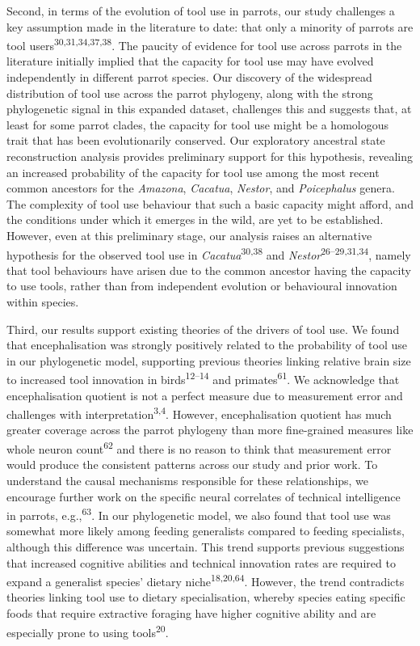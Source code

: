 \documentclass[
  man, donotrepeattitle,floatsintext]{apa6}
\begin{document}
Second, in terms of the evolution of tool use in parrots, our study challenges a
key assumption made in the literature to date: that only a minority of parrots
are tool users\textsuperscript{30,31,34,37,38}.
The paucity of evidence for tool use across parrots in the literature initially
implied that the capacity for tool use may have evolved independently in
different parrot species. Our discovery of the widespread distribution of tool
use across the parrot phylogeny, along with the strong phylogenetic signal in
this expanded dataset, challenges this and suggests that, at least for some
parrot clades, the capacity for tool use might be a homologous trait that has
been evolutionarily conserved. Our exploratory ancestral state reconstruction
analysis provides preliminary support for this hypothesis, revealing an
increased probability of the capacity for tool use among the most recent common
ancestors for the \emph{Amazona}, \emph{Cacatua}, \emph{Nestor}, and \emph{Poicephalus} genera. The
complexity of tool use behaviour that such a basic capacity might afford, and
the conditions under which it emerges in the wild, are yet to be established.
However, even at this preliminary stage, our analysis raises an alternative
hypothesis for the observed tool use in \emph{Cacatua}\textsuperscript{30,38}
and \emph{Nestor}\textsuperscript{26--29,31,34}, namely that tool behaviours have arisen due to the
common ancestor having the capacity to use tools, rather than from independent
evolution or behavioural innovation within species.

Third, our results support existing theories of the drivers of tool use. We
found that encephalisation was strongly positively related to the probability of
tool use in our phylogenetic model, supporting previous theories linking
relative brain size to increased tool innovation in birds\textsuperscript{12--14} and primates\textsuperscript{61}. We acknowledge that
encephalisation quotient is not a perfect measure due to measurement error and
challenges with interpretation\textsuperscript{3,4}. However, encephalisation
quotient has much greater coverage across the parrot phylogeny than more
fine-grained measures like whole neuron count\textsuperscript{62} and there is no reason
to think that measurement error would produce the consistent patterns across our
study and prior work. To understand the causal mechanisms responsible for these
relationships, we encourage further work on the specific neural correlates of
technical intelligence in parrots, e.g.,\textsuperscript{63}. In our phylogenetic
model, we also found that tool use was somewhat more likely among feeding
generalists compared to feeding specialists, although this difference was
uncertain. This trend supports previous suggestions that increased cognitive
abilities and technical innovation rates are required to expand a generalist
species' dietary niche\textsuperscript{18,20,64}. However, the trend contradicts theories linking tool use to
dietary specialisation, whereby species eating specific foods that require
extractive foraging have higher cognitive ability and are especially prone to
using tools\textsuperscript{20}.
\end{document}
